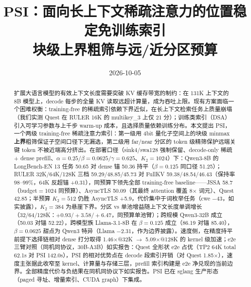 \documentclass[11pt]{article}
\title{PSI：面向长上下文稀疏注意力的位置稳定免训练索引\\
\large 块级上界粗筛与远/近分区预算}
\date{2026-10-05}
\begin{document}
\maketitle

\begin{abstract}
扩展大语言模型的有效上下文长度需要突破 KV 缓存带宽的制约：在 131K 上下文的 8B 模型上，decode 每步的全量 KV 读取远超计算量，成为吞吐上限。现有方案面临一个困难权衡：training-free 的稀疏索引依赖下界近似，在长上下文检索任务上质量崩塌（我们实测 Quest 在 RULER 16K 的 multikey\_3 上仅 21 分）；训练类索引（DSA）引入可学习参数与上千步 warm-up 成本，且选择质量依赖训练分布。本文提出 PSI，一个两级 training-free 稀疏注意力索引：第一级用 4bit 量化子空间上的块级 minmax \textbf{上界}粗筛保证子空间口径下无漏选，第二级用 far/near 分区的 token 级精筛保护远端关键 token 不被近端高分挤出。在部署口径（sink4/swa128 强制保留、decode-only 稀疏 + dense prefill、$\alpha{=}0.25/\beta{=}0.0625/\gamma{=}0.625$、$K_2{=}1024$）下：Qwen3-8B 的 LongBench-EN 13 任务 50.65 对 dense 锚 50.36 持平（$\beta{=}0.125$ 同口径 51.25）；RULER 32K/64K/128K 三档 59.29/48.85/45.73 对 FullKV 59.38/48.54/46.43（保持率 98--99\%，64K 反超锚 +0.31），同预算下领先全部 training-free baseline——JSSA 58.7（budget$=$1024 同预算）、AsyncTLS 50.09（其最终 attention 覆盖 8$\times$ 词元）、Quest 42.85；半预算 $K_2{=}512$ 仍胜 AsyncTLS +5.9，代价集中于词枚举任务（cwe $-43$，如实披露），$K_2{=}384$ 为悬崖下界。分区 vs 单池增益随上下文长度单调增长（32/64/128K：$+0.93/+3.58/+6.47$，同预算单池臂）；跨规模 Qwen3-32B 成立（50.03 对锚 52.22），跨模型族 Llama-3.1-8B 在 $\beta{=}0.125$ 成立（86.19 对锚 85.40），$\beta{=}0.0625$ 甜点为 Qwen3 特异（Llama $-2.31$，作为边界披露）。速度侧，在精度持平前提下选择链相对 dense 打分取得 1.46$\times$@32K $\rightarrow$ 5.09$\times$@128K 的 kernel 级加速；e2e 三臂对照（同机同协议，30B-A3B）如实报告：Quest 全形状 e2e 占优（TP2 64K total 62.1s 对 PSI 142.0s），PSI 的相对优势点在 decode 段索引开销（对 Quest 1.85$\times$），速度主张据此收窄至 kernel、计算量与存储三层，prefill 索引构建是 e2e 净兑现的当前边界。全部精度代价与负结果在同机同协议下如实报告。PSI 已在 sglang 生产形态（paged 寻址、增量索引、CUDA graph）下集成。
\end{abstract}

\end{document}
